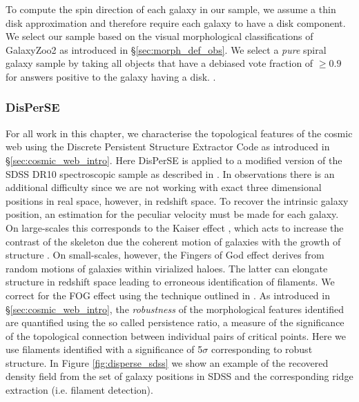 To compute the spin direction of each galaxy in our sample, we assume a thin disk approximation and therefore require each galaxy to have a disk component. We select our sample based on the visual morphological classifications of GalaxyZoo2 \citep[GZ2][]{willett2013} as introduced in \S\ref{sec:morph_def_obs}. We select a \textit{pure} spiral galaxy sample by taking all objects that have a debiased vote fraction of $\geq 0.9$ for answers positive to the galaxy having a disk. .

\subsubsection{DisPerSE}
For all work in this chapter, we characterise the topological features of the cosmic web using the Discrete Persistent Structure Extractor Code \citep{sousbie2011a, sousbie2011b} as introduced in \S\ref{sec:cosmic_web_intro}. Here DisPerSE is applied to a modified version of the SDSS DR10 spectroscopic sample as described in \citet{tempel2014}. In observations there is an additional difficulty since we are not working with exact three dimensional positions in real space, however, in redshift space. To recover the intrinsic galaxy position, an estimation for the peculiar velocity must be made for each galaxy. On large-scales this corresponds to the Kaiser effect \citep{kaiser1987}, which acts to increase the contrast of the skeleton due the coherent motion of galaxies with the growth of structure \citep[e.g.][]{shi2016}. On small-scales, however, the Fingers of God effect \citep[FOG;][]{jackson1972,tulley1978} derives from random motions of galaxies within virialized haloes. The latter can elongate structure in redshift space leading to erroneous identification of filaments. We correct for the FOG effect using the technique outlined in \citet{kraljic2018}. As introduced in \S\ref{sec:cosmic_web_intro}, the \textit{robustness} of the morphological features identified are quantified using the so called persistence ratio, a measure of the significance of the topological connection between individual pairs of critical points. Here we use filaments identified with a significance of 5$\sigma$ corresponding to robust structure. In Figure \ref{fig:disperse_sdss} we show an example of the recovered density field from the set of galaxy positions in SDSS and the corresponding ridge extraction (i.e. filament detection). 

